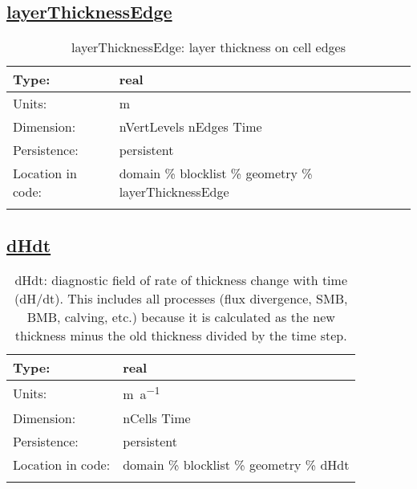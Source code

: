 \subsection[layerThicknessEdge]{\hyperref[sec:var_tab_geometry]{layerThicknessEdge}}
\label{subsec:var_sec_geometry_layerThicknessEdge}
\begin{center}
\begin{longtable}{| p{2.0in} | p{4.0in} |}
        \hline 
        Type: & real \\
        \hline 
        Units: & \si{m} \\
        \hline 
        Dimension: & nVertLevels nEdges Time \\
        \hline 
        Persistence: & persistent \\
        \hline 
         Location in code: & domain \% blocklist \% geometry \% layerThicknessEdge \\
         \hline 
    \caption{layerThicknessEdge: layer thickness on cell edges}
\end{longtable}
\end{center}
\subsection[dHdt]{\hyperref[sec:var_tab_geometry]{dHdt}}
\label{subsec:var_sec_geometry_dHdt}
\begin{center}
\begin{longtable}{| p{2.0in} | p{4.0in} |}
        \hline 
        Type: & real \\
        \hline 
        Units: & \si{m.a^{-1}} \\
        \hline 
        Dimension: & nCells Time \\
        \hline 
        Persistence: & persistent \\
        \hline 
         Location in code: & domain \% blocklist \% geometry \% dHdt \\
         \hline 
    \caption{dHdt: diagnostic field of rate of thickness change with time (dH/dt). This includes all processes (flux divergence, SMB, BMB, calving, etc.) because it is calculated as the new thickness minus the old thickness divided by the time step.}
\end{longtable}
\end{center}
